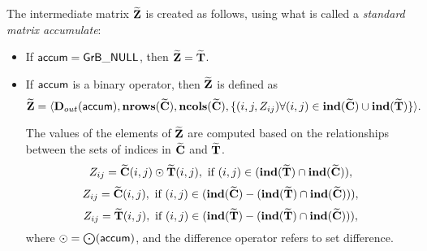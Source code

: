 
The intermediate matrix ${\bf \widetilde{Z}}$ is created as follows, using what is called a \emph{standard matrix accumulate}:
\begin{itemize}
    \item If ${\sf accum} = {\sf GrB\_NULL}$, then ${\bf \widetilde{Z}} = {\bf \widetilde{T}}$.

    \item If ${\sf accum}$ is a binary operator, then ${\bf \widetilde{Z}}$ is defined as
        \[ {\bf \widetilde{Z}} = \langle \mbox{$\mathbf{D}_{out}$}({\sf accum}), \bold{nrows}({\bf \widetilde{C}}), \bold{ncols}({\bf \widetilde{C}}),
        \{(i,j,Z_{ij})  \forall (i,j) \in \bold{ind}({\bf \widetilde{C}}) \cup 
        \bold{ind}({\bf \widetilde{T}}) \} \rangle.\]

    The values of the elements of ${\bf \widetilde{Z}}$ are computed based on the
    relationships between the sets of indices in ${\bf \widetilde{C}}$ and 
    ${\bf \widetilde{T}}$.
\[
    Z_{ij} = {\bf \widetilde{C}}(i,j) \odot {\bf \widetilde{T}}(i,j), \ \mbox{if}\  
    (i,j) \in  (\bold{ind}({\bf \widetilde{T}}) \cap \bold{ind}({\bf \widetilde{C}})),
\]
\[
    Z_{ij} = {\bf \widetilde{C}}(i,j), \ \mbox{if}\  
    (i,j) \in (\bold{ind}({\bf \widetilde{C}}) - (\bold{ind}({\bf \widetilde{T}})
    \cap \bold{ind}({\bf \widetilde{C}}))),
\]
\[
    Z_{ij} = {\bf \widetilde{T}}(i,j), \ \mbox{if}\  (i,j) \in  
    (\bold{ind}({\bf \widetilde{T}}) - (\bold{ind}({\bf \widetilde{T}})
    \cap \bold{ind}({\bf \widetilde{C}}))),
\]
where $\odot  = \bigodot({\sf accum})$, and the difference operator refers to set difference.
\end{itemize}
